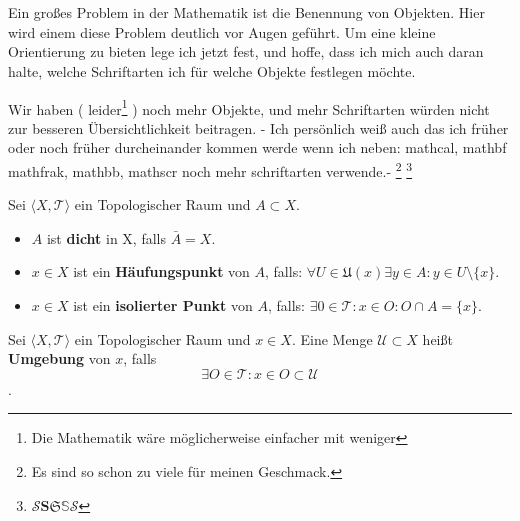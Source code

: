 \chapter{}
Ein großes Problem in der Mathematik ist die Benennung von Objekten.
Hier wird einem diese Problem deutlich vor Augen geführt.
Um eine kleine Orientierung zu bieten lege ich jetzt fest, und hoffe, dass
ich mich auch daran halte, welche Schriftarten ich für welche Objekte festlegen
möchte.

Wir haben ( leider\footnote{Die Mathematik wäre möglicherweise einfacher mit weniger} ) 
noch mehr Objekte, und mehr Schriftarten würden nicht zur besseren
Übersichtlichkeit beitragen.  - Ich persönlich weiß auch das ich früher 
oder noch früher durcheinander kommen werde wenn ich neben:
mathcal{}, mathbf{} mathfrak{}, mathbb{}, mathscr{} noch mehr schriftarten verwende.-
\footnote{ Es sind so schon zu viele für meinen Geschmack.}
\footnote{$\mathcal{S} \mathbf{S} \mathfrak{S} \mathbb{S} \mathscr{S}$} 


{
    Sei $\langle X, \mathcal{T}\rangle$ ein Topologischer Raum und $A \subset X$.
\begin{itemize}
    \item $A$ ist \textbf{dicht} in X, falls $\bar{A} = X$.
    \item $x \in X$ ist ein \textbf{Häufungspunkt} von $A$, falls:
     $\forall U \in \mathfrak U(x) \exists y \in A : y \in U \setminus \{ x \}$.
    \item $x \in X$ ist ein \textbf{isolierter Punkt} von $A$, falls:
     $\exists 0 \in \mathcal{T} : x \in O : O \cap A = \{x\}$.
\end{itemize}
}

{
    Sei $\langle X, \mathcal{T}\rangle$ ein Topologischer Raum und $x \in X$.
    Eine Menge $\mathcal{U} \subset X$ heißt \textbf{Umgebung} von $x$, falls
    $$
    \exists O \in \mathcal{T} : x \in O \subset \mathcal{U}
    $$.
}

